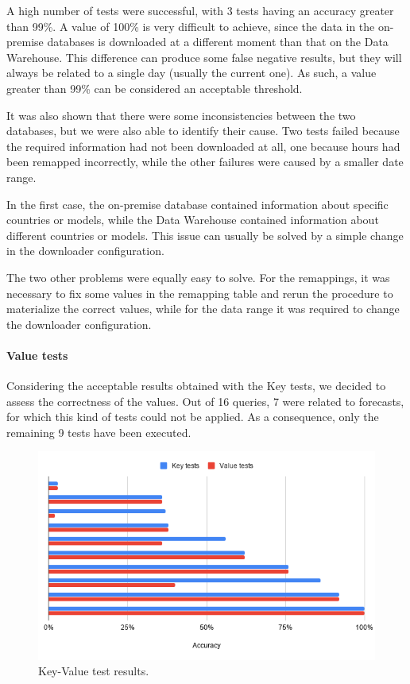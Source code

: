     A high number of tests were successful, with 3 tests having an accuracy greater than 99\%.
    A value of 100\% is very difficult to achieve, since the data in the on-premise databases is downloaded at a different moment than that on the Data Warehouse.
    This difference can produce some false negative results, but they will always be related to a single day (usually the current one).
    As such, a value greater than 99\% can be considered an acceptable threshold.
    
    It was also shown that there were some inconsistencies between the two databases, but we were also able to identify their cause.
    Two tests failed because the required information had not been downloaded at all, one because hours had been remapped incorrectly, while the other failures were caused by a smaller date range.
    
    In the first case, the on-premise database contained information about specific countries or models, while the Data Warehouse contained information about different countries or models.
    This issue can usually be solved by a simple change in the downloader configuration.
    
    The two other problems were equally easy to solve.
    For the remappings, it was necessary to fix some values in the remapping table and rerun the procedure to materialize the correct values, while for the data range it was required to change the downloader configuration.
    
\paragraph{Value tests}
    Considering the acceptable results obtained with the Key tests, we decided to assess the correctness of the values.
    Out of 16 queries, 7 were related to forecasts, for which this kind of tests could not be applied.
    As a consequence, only the remaining 9 tests have been executed.
    
    \begin{figure}
        \centering
        \includegraphics[width=\textwidth]{res/tests/data_val_1.png}
        \caption{Key-Value test results.}
        \label{fig:tests:data:value_1}
    \end{figure}
    
